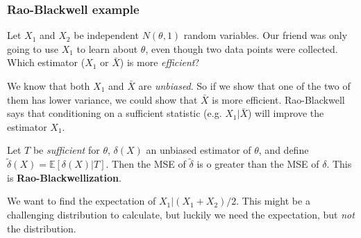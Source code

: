 \documentclass[titlepage, 12pt, leqno]{article}
\begin{document}
\subsubsection{Rao-Blackwell example}

Let $X_{1}$ and $X_{2}$ be independent $N(\theta,1)$ random variables. Our
friend was only going to use $X_{1}$ to learn about $\theta$, even though two
data points were collected. Which estimator ($X_{1}$ or $\bar X$) is more
\textit{efficient}?

We know that both $X_{1}$ and $\bar X$ are \textit{unbiased}. So if we show
that one of the two of them has lower variance, we could show that $\bar X$
is more efficient. Rao-Blackwell says that conditioning on a sufficient
statistic (e.g. $X_{1}|\bar X$) will improve the estimator $X_{1}$.

\begin{definition}
    Let $T$ be \textit{sufficient} for $\theta$, $\delta(X)$ an unbiased
    estimator of $\theta$, and define $\tilde{\delta}(X) = \mathbb{E}[
    \delta(X)|T]$. Then the MSE of $\tilde{\delta}$ is o greater than the MSE
    of $\delta$. This is \textbf{Rao-Blackwellization}.
\end{definition}

We want to find the expectation of $X_{1} | (X_{1}+X_{2})/2$. This might be
a challenging distribution to calculate, but luckily we need the expectation,
but \textit{not} the distribution.
\end{document}
